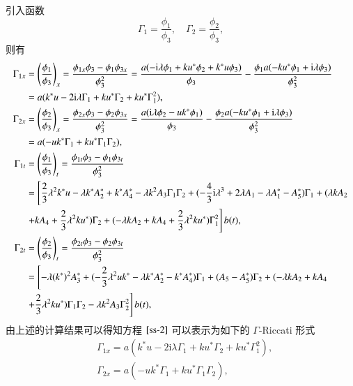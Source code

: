 引入函数
\begin{equation}
  \Gamma_{1} = \frac{\phi_{1}}{\phi_{3}}, \quad \Gamma_{2} = \frac{\phi_{2}}{\phi_{3}},
\end{equation}
则有
\begin{align}
  \Gamma_{1x} &= \left(\frac{\phi_1}{\phi_3}\right)_x=\frac{\phi_{1x}\phi_3-\phi_1\phi_{3x}}{\phi_3^2}=\frac{a(-\mathrm{i}\lambda\phi_1+ku^*\phi_2+k^*u\phi_3)}{\phi_3}-\frac{\phi_1a(-ku^*\phi_1+\mathrm{i}\lambda\phi_3)}{\phi_3^2} \nonumber\\
  &= a(k^{*}u - 2\mathrm{i}\lambda \Gamma_{1} + ku^{*}\Gamma_{2} + ku^{*}\Gamma_{1}^{2}), \\
  \Gamma_{2x} &=\left(\frac{\phi_2}{\phi_3}\right)_x=\frac{\phi_{2x}\phi_3-\phi_2\phi_{3x}}{\phi_3^2}=\frac{a(\mathrm{i}\lambda\phi_2-uk^*\phi_1)}{\phi_3}-\frac{\phi_2a(-ku^*\phi_1+\mathrm{i}\lambda\phi_3)}{\phi_3^2}\nonumber\\
  &= a(-uk^{*}\Gamma_{1} + ku^{*}\Gamma_{1}\Gamma_{2}), \\
  \Gamma_{1t} &= \left(\frac{\phi_1}{\phi_3}\right)_t=\frac{\phi_{1t}\phi_3-\phi_1\phi_{3t}}{\phi_3^2} \notag \\
  &= \left[\frac{2}{3}\lambda^{2}k^{*}u - \lambda k^{*}A_{2}^{*} + k^{*}A_{4}^{*} - \lambda k^{2}A_{3}\Gamma_{1}\Gamma_{2} + (-\frac{4}{3}\mathrm{i}\lambda^{3} + 2\lambda A_{1} - \lambda A_{1}^{*} - A_{5}^{*})\Gamma_{1} + (\lambda kA_{2} \right. \notag\\
  & \left. + kA_{4} + \frac{2}{3}\lambda^{2}ku^{*})\Gamma_{2} + (-\lambda kA_{2} + kA_{4} + \frac{2}{3}\lambda^{2}ku^{*})\Gamma_{1}^{2}\right] b(t), \label{ss-gt1}\\
  \Gamma_{2t} &=\left(\frac{\phi_2}{\phi_3}\right)_t=\frac{\phi_{2t}\phi_3-\phi_2\phi_{3t}}{\phi_3^2} \notag \\
  &= \left[ -\lambda(k^{*})^{2}A_{3}^{*} + (-\frac{2}{3}\lambda^{2}uk^{*} - \lambda k^{*}A_{2}^{*} - k^{*}A_{4}^{*})\Gamma_{1} + (A_{5}-A_{5}^{*})\Gamma_{2} + (-\lambda kA_{2} +kA_{4} \right. \notag\\
  & \left. + \frac{2}{3}\lambda^{2}ku^{*})\Gamma_{1}\Gamma_{2} - \lambda k^{2}A_{3}\Gamma_{2}^{2} \right] b(t), \label{ss-gt2}
\end{align}
由上述的计算结果可以得知方程 $\ref{ss-2}$ 可以表示为如下的 $\Gamma$-Riccati 形式
\begin{align}
  & \Gamma_{1x} = a(k^{*}u - 2\mathrm{i}\lambda \Gamma_{1} + ku^{*}\Gamma_{2} + ku^{*}\Gamma_{1}^{2}), \label{ss-4} \\
  & \Gamma_{2x} = a(-uk^{*}\Gamma_{1} + ku^{*}\Gamma_{1}\Gamma_{2}), \label{ss-5}
\end{align}
